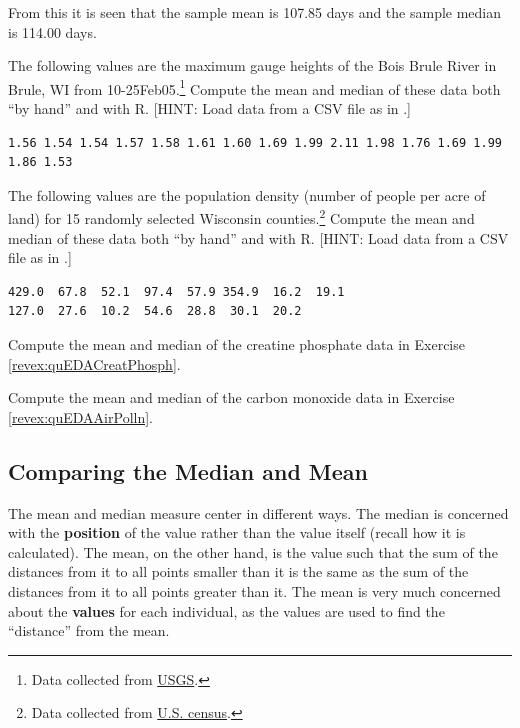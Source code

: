 \documentclass[10pt,openany]{book}\usepackage[]{graphicx}\usepackage[]{color}
\begin{document}
From this it is seen that the sample mean is 107.85 days and the sample median is 114.00 days.

\begin{exsection}
  \item \label{revex:quEDABrule} \rhw{} The following values are the maximum gauge heights of the Bois Brule River in Brule, WI from 10-25Feb05.\footnote{Data collected from \href{http://waterdata.usgs.gov/wi/nwis/uv?04025500}{USGS}.}  Compute the mean and median of these data both ``by hand'' and with R.  [HINT: Load data from a CSV file as in .] 
  \begin{Verbatim}[xleftmargin=5mm]
1.56 1.54 1.54 1.57 1.58 1.61 1.60 1.69 1.99 2.11 1.98 1.76 1.69 1.99 1.86 1.53
  \end{Verbatim}

  \item \label{revex:quEDAWIc} \rhw{} The following values are the population density (number of people per acre of land) for 15 randomly selected Wisconsin counties.\footnote{Data collected from \href{http://factfinder.census.gov/}{U.S. census}.}  Compute the mean and median of these data both ``by hand'' and with R.  [HINT: Load data from a CSV file as in .] 
  \begin{Verbatim}[xleftmargin=5mm]
429.0  67.8  52.1  97.4  57.9 354.9  16.2  19.1
127.0  27.6  10.2  54.6  28.8  30.1  20.2
  \end{Verbatim}

  \item \label{revex:quEDACreatPhosph2} \rhw{} Compute the mean and median of the creatine phosphate data in Exercise \ref{revex:quEDACreatPhosph}. 

    \item \label{revex:quEDAAirPolln2} \rhw{} \hspace{12pt} Compute the mean and median of the carbon monoxide data in Exercise \ref{revex:quEDAAirPolln}. 
\end{exsection}

\subsection{Comparing the Median and Mean} \label{sect:MeanMedian}
The mean and median measure center in different ways.  The median is concerned with the \textbf{position} of the value rather than the value itself (recall how it is calculated).  The mean, on the other hand, is the value such that the sum of the distances from it to all points smaller than it is the same as the sum of the distances from it to all points greater than it.  The mean is very much concerned about the \textbf{values} for each individual, as the values are used to find the ``distance'' from the mean.
\end{document}
